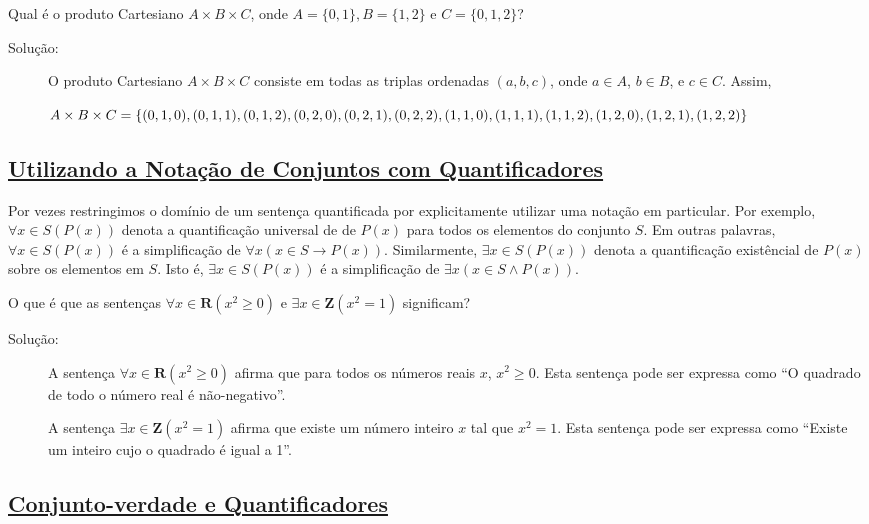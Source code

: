 \begin{exmp}
\label{exem312}
Qual é o produto Cartesiano $A \times B \times C$, onde $A = \{0,1\}, B=\{1,2\}$
e $C = \{0,1,2\}$?
\begin{description}
\item[Solução:]O produto Cartesiano $A\times B\times C$ consiste em todas as
triplas ordenadas $(a,b,c)$, onde $a \in A$, $b \in B$, e $c \in C$. Assim,
\begin{center}
$A\times B\times C =
\{(0,1,0),(0,1,1),(0,1,2),(0,2,0),(0,2,1)\\,(0,2,2),(1,1,0),(1,1,1),(1,1,2),(1,2,0),(1,2,1),(1,2,2)\}$
\end{center}
\end{description}
\end{exmp}


\subsection*{\underline{Utilizando a Notação de Conjuntos com Quantificadores}}

Por vezes restringimos o domínio de um sentença quantificada por explicitamente
utilizar uma notação em particular. Por exemplo, $\forall x\in S(P(x))$ denota a
quantificação universal de de $P(x)$ para todos os elementos do conjunto $S$. Em
outras palavras, $\forall x\in S(P(x))$ é a simplificação de $\forall x (x \in
S \to P(x))$. Similarmente, $\exists x\in S(P(x))$ denota a quantificação
existêncial de $P(x)$ sobre os elementos em $S$. Isto é, $\exists x\in S(P(x))$
é a simplificação de $\exists x(x \in S \land P(x))$.

\begin{exmp}
\label{exem313}
O que é que as sentenças $\forall x\in \textbf{R}(x^2 \geq 0)$ e $\exists x \in
\textbf{Z}(x^2 = 1)$ significam?
\begin{description}
\item[Solução:] A sentença $\forall x\in \textbf{R}(x^2 \geq 0)$ afirma que para
todos os números reais $x$, $x^2 \geq 0$. Esta sentença pode ser expressa como
``O quadrado de todo o número real é não-negativo''.

A sentença $\exists x \in \textbf{Z}(x^2 = 1)$ afirma que existe um número
inteiro $x$ tal que $x^2 = 1$. Esta sentença
pode ser expressa como ``Existe um inteiro cujo o quadrado é igual a 1''.
\end{description}
\end{exmp}

\subsection*{\underline{Conjunto-verdade e Quantificadores}}

